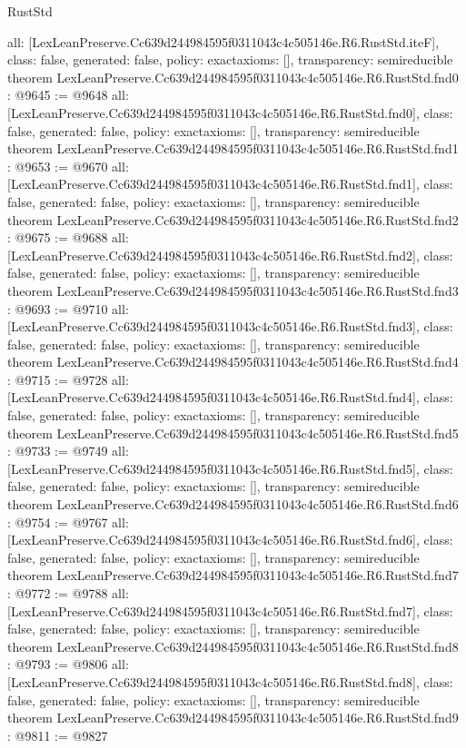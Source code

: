 \begin{lexlean}{RustStd}
\begin{coremodule}
{  all: [LexLeanPreserve.Cc639d244984595f0311043c4c505146e.R6.RustStd.iteF],
  class: false,
  generated: false,
  policy: exact{axioms: []},
  transparency: semireducible
}
theorem LexLeanPreserve.Cc639d244984595f0311043c4c505146e.R6.RustStd.fnd0 : @9645 := @9648 {
  all: [LexLeanPreserve.Cc639d244984595f0311043c4c505146e.R6.RustStd.fnd0],
  class: false,
  generated: false,
  policy: exact{axioms: []},
  transparency: semireducible
}
theorem LexLeanPreserve.Cc639d244984595f0311043c4c505146e.R6.RustStd.fnd1 : @9653 := @9670 {
  all: [LexLeanPreserve.Cc639d244984595f0311043c4c505146e.R6.RustStd.fnd1],
  class: false,
  generated: false,
  policy: exact{axioms: []},
  transparency: semireducible
}
theorem LexLeanPreserve.Cc639d244984595f0311043c4c505146e.R6.RustStd.fnd2 : @9675 := @9688 {
  all: [LexLeanPreserve.Cc639d244984595f0311043c4c505146e.R6.RustStd.fnd2],
  class: false,
  generated: false,
  policy: exact{axioms: []},
  transparency: semireducible
}
theorem LexLeanPreserve.Cc639d244984595f0311043c4c505146e.R6.RustStd.fnd3 : @9693 := @9710 {
  all: [LexLeanPreserve.Cc639d244984595f0311043c4c505146e.R6.RustStd.fnd3],
  class: false,
  generated: false,
  policy: exact{axioms: []},
  transparency: semireducible
}
theorem LexLeanPreserve.Cc639d244984595f0311043c4c505146e.R6.RustStd.fnd4 : @9715 := @9728 {
  all: [LexLeanPreserve.Cc639d244984595f0311043c4c505146e.R6.RustStd.fnd4],
  class: false,
  generated: false,
  policy: exact{axioms: []},
  transparency: semireducible
}
theorem LexLeanPreserve.Cc639d244984595f0311043c4c505146e.R6.RustStd.fnd5 : @9733 := @9749 {
  all: [LexLeanPreserve.Cc639d244984595f0311043c4c505146e.R6.RustStd.fnd5],
  class: false,
  generated: false,
  policy: exact{axioms: []},
  transparency: semireducible
}
theorem LexLeanPreserve.Cc639d244984595f0311043c4c505146e.R6.RustStd.fnd6 : @9754 := @9767 {
  all: [LexLeanPreserve.Cc639d244984595f0311043c4c505146e.R6.RustStd.fnd6],
  class: false,
  generated: false,
  policy: exact{axioms: []},
  transparency: semireducible
}
theorem LexLeanPreserve.Cc639d244984595f0311043c4c505146e.R6.RustStd.fnd7 : @9772 := @9788 {
  all: [LexLeanPreserve.Cc639d244984595f0311043c4c505146e.R6.RustStd.fnd7],
  class: false,
  generated: false,
  policy: exact{axioms: []},
  transparency: semireducible
}
theorem LexLeanPreserve.Cc639d244984595f0311043c4c505146e.R6.RustStd.fnd8 : @9793 := @9806 {
  all: [LexLeanPreserve.Cc639d244984595f0311043c4c505146e.R6.RustStd.fnd8],
  class: false,
  generated: false,
  policy: exact{axioms: []},
  transparency: semireducible
}
theorem LexLeanPreserve.Cc639d244984595f0311043c4c505146e.R6.RustStd.fnd9 : @9811 := @9827 {
}
\end{coremodule}
\end{lexlean}
